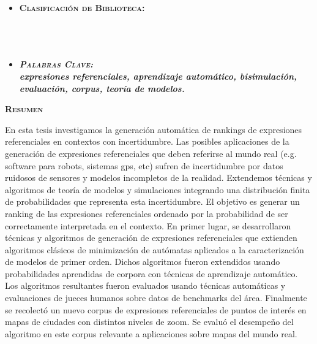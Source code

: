 \thispagestyle{empty}

\begin{itemize}
	\item \textbf{\textsc{Clasificaci\'on de Biblioteca:}} \\ \\  \\ \\

	\item \textbf{\emph{\textsc{Palabras Clave:} \\ expresiones referenciales, aprendizaje autom\'atico, bisimulaci\'on, evaluaci\'on, corpus, teor\'ia de modelos.}}
\end{itemize}

\begin{center}

{ \vspace*{1cm} }
\huge{\textbf{\textsc{\textmd{Resumen}}}}\\[1cm]

\end{center}

\normalsize{


En esta tesis investigamos la generaci\'on autom\'atica de rankings de
expresiones referenciales en contextos con incertidumbre. Las
posibles aplicaciones de la generaci\'on de expresiones referenciales
que deben referirse al mundo real (e.g. software para robots, sistemas
gps, etc) sufren de incertidumbre por datos ruidosos de sensores y
modelos incompletos de la realidad. Extendemos t\'ecnicas y algoritmos
de teor\'ia de modelos y simulaciones integrando una distribuci\'on finita
de probabilidades que representa esta incertidumbre. El objetivo es
generar un ranking de las expresiones referenciales ordenado por la
probabilidad de ser correctamente interpretada en el contexto. En
primer lugar, se desarrollaron t\'ecnicas y algoritmos de generaci\'on de
expresiones referenciales que extienden algoritmos cl\'asicos de
minimizaci\'on de aut\'omatas aplicados a la caracterizaci\'on de modelos de
primer orden. Dichos algoritmos fueron extendidos usando
probabilidades aprendidas de corpora con t\'ecnicas de aprendizaje
autom\'atico. Los algoritmos resultantes fueron evaluados usando
t\'ecnicas autom\'aticas y evaluaciones de jueces humanos sobre datos de
benchmarks del \'area. Finalmente se recolect\'o un nuevo corpus de
expresiones referenciales de puntos de inter\'es en mapas de ciudades
con distintos niveles de zoom. Se evalu\'o el desempe\~no del algoritmo en
este corpus relevante a aplicaciones sobre mapas del mundo real.
}

